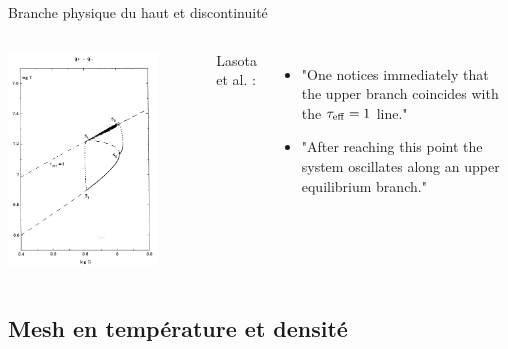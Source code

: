 \documentclass{beamer}
\begin{document}
\begin{frame}{Branche physique du haut et discontinuité}
  \begin{columns}
      \includegraphics[width=0.8\textwidth]{Lasotaetal.png}

      Lasota et al. :
      \begin{itemize}
        \item "One notices immediately that the upper branch coincides with the $\tau_{\rm{eff}} = 1$ line."
        \item "After reaching this point the system oscillates along an upper equilibrium branch."
      \end{itemize}
  \end{columns}
\end{frame}

\subsection{Mesh en température et densité}
\end{document}
